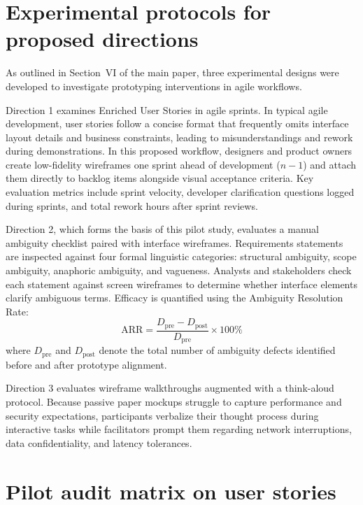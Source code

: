 \documentclass[11pt,a4paper]{article}
\begin{document}
\section{Experimental protocols for proposed directions}

As outlined in Section~VI of the main paper, three experimental designs were developed to investigate prototyping interventions in agile workflows.

Direction 1 examines Enriched User Stories in agile sprints. In typical agile development, user stories follow a concise format that frequently omits interface layout details and business constraints, leading to misunderstandings and rework during demonstrations. In this proposed workflow, designers and product owners create low-fidelity wireframes one sprint ahead of development ($n-1$) and attach them directly to backlog items alongside visual acceptance criteria. Key evaluation metrics include sprint velocity, developer clarification questions logged during sprints, and total rework hours after sprint reviews.

Direction 2, which forms the basis of this pilot study, evaluates a manual ambiguity checklist paired with interface wireframes. Requirements statements are inspected against four formal linguistic categories: structural ambiguity, scope ambiguity, anaphoric ambiguity, and vagueness. Analysts and stakeholders check each statement against screen wireframes to determine whether interface elements clarify ambiguous terms. Efficacy is quantified using the Ambiguity Resolution Rate:
\begin{equation}
    \text{ARR} = \frac{D_{\text{pre}} - D_{\text{post}}}{D_{\text{pre}}} \times 100\%
\end{equation}
where $D_{\text{pre}}$ and $D_{\text{post}}$ denote the total number of ambiguity defects identified before and after prototype alignment.

Direction 3 evaluates wireframe walkthroughs augmented with a think-aloud protocol. Because passive paper mockups struggle to capture performance and security expectations, participants verbalize their thought process during interactive tasks while facilitators prompt them regarding network interruptions, data confidentiality, and latency tolerances.

\section{Pilot audit matrix on user stories}
\end{document}

